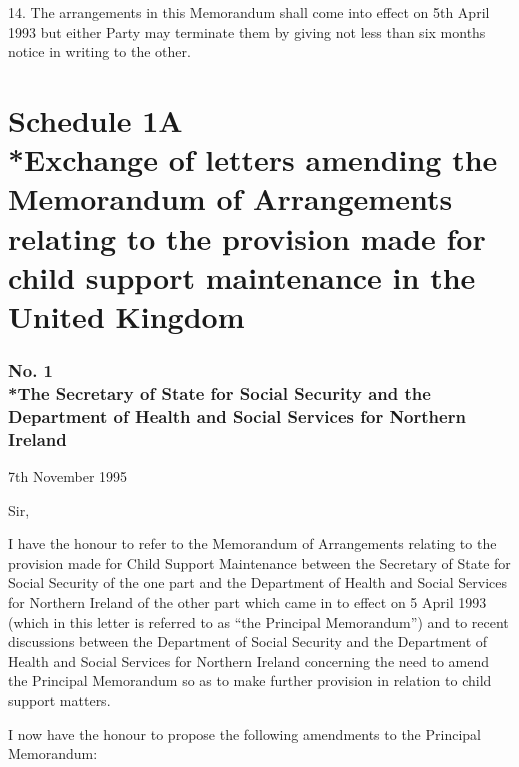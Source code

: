 \documentclass[12pt,a4paper]{article}
\begin{document}
14.   The arrangements in this Memorandum shall come into effect on 5th April 1993 but either Party may terminate them by giving not less than six months notice in writing to the other.

\vfill

\part[Schedule 1A --- Exchange of letters amending the Memorandum of Arrangements relating to the provision made for child support maintenance in the United Kingdom]{Schedule 1A\\*Exchange of letters amending the Memorandum of Arrangements relating to the provision made for child support maintenance in the United Kingdom}

\renewcommand\parthead{--- Schedule 1A}


\section*{\sloppy No. 1\\*The Secretary of State for Social Security and the Department of Health and Social Services for Northern Ireland}

7th November 1995

  Sir,

  I have the honour to refer to the Memorandum of Arrangements relating to the provision made for Child Support Maintenance between the Secretary of State for Social Security of the one part and the Department of Health and Social Services for Northern Ireland of the other part which came in to effect on 5 April 1993 (which in this letter is referred to as “the Principal Memorandum”) and to recent discussions between the Department of Social Security and the Department of Health and Social Services for Northern Ireland concerning the need to amend the Principal Memorandum so as to make further provision in relation to child support matters.

  I now have the honour to propose the following amendments to the Principal Memorandum:
\end{document}
